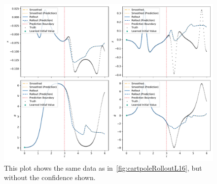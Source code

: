	\begin{figure}
		\centering
		\includegraphics[width=\linewidth]{figures/results/cartpole-gym/run-latent-dim-16/without-confidence/rollout-observations-N0.pdf}
		\caption{This plot shows the same data as in~\autoref{fig:cartpoleRolloutL16}, but without the confidence shown.}
		\label{fig:cartpoleRolloutL16Appendix}
	\end{figure}

